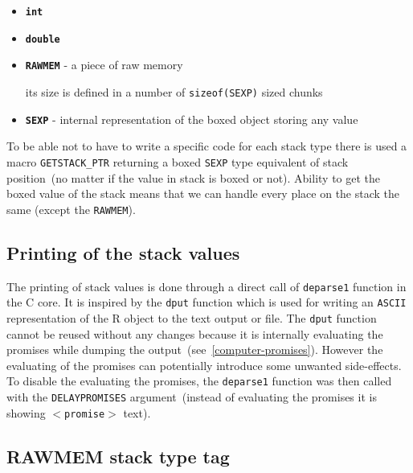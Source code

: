 \documentclass[thesis=M,english]{FITthesis}[2018/10/20]
\newcommand{\code}[1]{\texttt{#1}}
\begin{document}
\begin{itemize}
	\item \textbf{\code{int}}
	\item \textbf{\code{double}}
	\item \textbf{\code{RAWMEM}} - a piece of raw memory

		its size is defined in a number of \code{sizeof(SEXP)} sized chunks
	\item \textbf{\code{SEXP}} - internal representation of the boxed object storing any value
\end{itemize}

To be able not to have to write a specific code for each stack type there is used a macro \code{GETSTACK{\_}PTR} returning a boxed \code{SEXP} type equivalent of stack position~(no matter if the value in stack is boxed or not). Ability to get the boxed value of the stack means that we can handle every place on the stack the same (except the \code{RAWMEM}).

\subsection{Printing of the stack values}\label{printing-stack-values}

The printing of stack values is done through a direct call of \code{deparse1} function in the C core. It is inspired by the \code{dput} function which is used for writing an \code{ASCII} representation of the R object to the text output or file. The \code{dput} function cannot be reused without any changes because it is internally evaluating the promises while dumping the output~(see~\ref{computer-promises}). However the evaluating of the promises can potentially introduce some unwanted side-effects. To disable the evaluating the promises, the \code{deparse1} function was then called with the \code{DELAYPROMISES} argument~(instead of evaluating the promises it is showing \code{$<$promise$>$} text).

\subsection{RAWMEM stack type tag}\label{rawmem-stack-tag}
\end{document}
